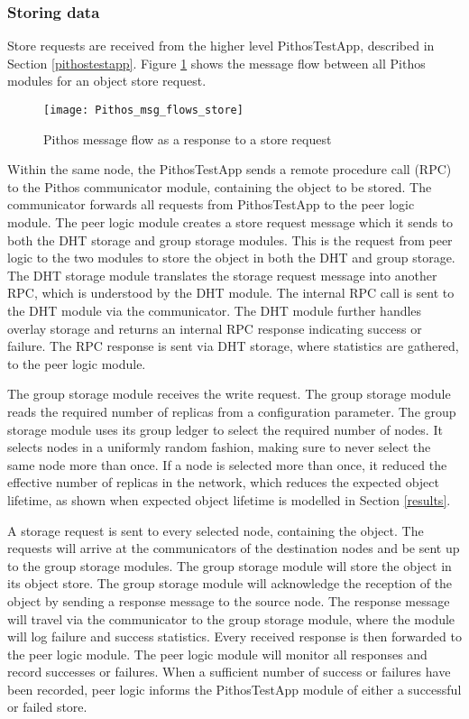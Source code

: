     \subsubsection{Storing data}
    \label{store_implementation}

    Store requests are received from the higher level PithosTestApp, described in Section \ref{pithostestapp}. Figure \ref{fig_pithos_msg_flow_store} shows the message flow between all Pithos modules for an object store request.

\begin{figure}[htbp]
 \centering
 \texttt{[image: Pithos\_msg\_flows\_store]}
 \caption{Pithos message flow as a response to a store request}
 \label{fig_pithos_msg_flow_store}
\end{figure}

Within the same node, the PithosTestApp sends a remote procedure call (RPC) to the Pithos communicator module, containing the object to be stored. The communicator forwards all requests from PithosTestApp to the peer logic module. The peer logic module creates a store request message which it sends to both the DHT storage and group storage modules. This is the request from peer logic to the two modules to store the object in both the DHT and group storage. The DHT storage module translates the storage request message into another RPC, which is understood by the DHT module. The internal RPC call is sent to the DHT module via the communicator. The DHT module further handles overlay storage and returns an internal RPC response indicating success or failure. The RPC response is sent via DHT storage, where statistics are gathered, to the peer logic module.

The group storage module receives the write request. The group storage module reads the required number of replicas from a configuration parameter. The group storage module uses its group ledger to select the required number of nodes. It selects nodes in a uniformly random fashion, making sure to never select the same node more than once. If a node is selected more than once, it reduced the effective number of replicas in the network, which reduces the expected object lifetime, as shown when expected object lifetime is modelled in Section \ref{results}.

A storage request is sent to every selected node, containing the object. The requests will arrive at the communicators of the destination nodes and be sent up to the group storage modules. The group storage module will store the object in its object store. The group storage module will acknowledge the reception of the object by sending a response message to the source node. The response message will travel via the communicator to the group storage module, where the module will log failure and success statistics. Every received response is then forwarded to the peer logic module. The peer logic module will monitor all responses and record successes or failures. When a sufficient number of success or failures have been recorded, peer logic informs the PithosTestApp module of either a successful or failed store.

